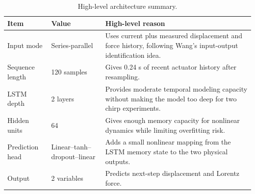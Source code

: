 \documentclass[11pt]{article}
\begin{document}
\begin{table}[H]
\centering
\small
\begin{tabular}{p{4cm}p{3cm}p{7cm}}
\toprule
Item & Value & High-level reason \\
\midrule
Input mode & Series-parallel & Uses current plus measured displacement and force history, following Wang's input-output identification idea. \\
Sequence length & 120 samples & Gives 0.24 s of recent actuator history after resampling. \\
LSTM depth & 2 layers & Provides moderate temporal modeling capacity without making the model too deep for two chirp experiments. \\
Hidden units & 64 & Gives enough memory capacity for nonlinear dynamics while limiting overfitting risk. \\
Prediction head & Linear--tanh--dropout--linear & Adds a small nonlinear mapping from the LSTM memory state to the two physical outputs. \\
Output & 2 variables & Predicts next-step displacement and Lorentz force. \\
\bottomrule
\end{tabular}
\caption{High-level architecture summary.}
\label{tab:arch_summary}
\end{table}
\end{document}
